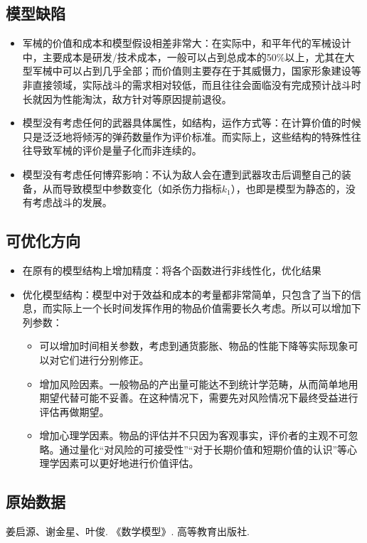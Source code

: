 \documentclass[UTF8]{mcmthesis}
\begin{document}
\subsection{模型缺陷}
\begin{itemize}
\item 军械的价值和成本和模型假设相差非常大：在实际中，和平年代的军械设计中，主要成本是研发/技术成本，一般可以占到总成本的50\%以上，尤其在大型军械中可以占到几乎全部；而价值则主要存在于其威慑力，国家形象建设等非直接领域，实际战斗的需求相对较低，而且往往会面临没有完成预计战斗时长就因为性能淘汰，敌方针对等原因提前退役。
\item 模型没有考虑任何的武器具体属性，如结构，运作方式等：在计算价值的时候只是泛泛地将倾泻的弹药数量作为评价标准。而实际上，这些结构的特殊性往往导致军械的评价是量子化而非连续的。
\item 模型没有考虑任何博弈影响：不认为敌人会在遭到武器攻击后调整自己的装备，从而导致模型中参数变化（如杀伤力指标$k_1$），也即是模型为静态的，没有考虑战斗的发展。
\end{itemize}

\subsection{可优化方向}
\begin{itemize}
\item 在原有的模型结构上增加精度：将各个函数进行非线性化，优化结果
\item 优化模型结构：模型中对于效益和成本的考量都非常简单，只包含了当下的信息，而实际上一个长时间发挥作用的物品价值需要长久考虑。所以可以增加下列参数：
\begin{itemize}
\item 可以增加时间相关参数，考虑到通货膨胀、物品的性能下降等实际现象可以对它们进行分别修正。
\item 增加风险因素。一般物品的产出量可能达不到统计学范畴，从而简单地用期望代替可能不妥善。在这种情况下，需要先对风险情况下最终受益进行评估再做期望。
\item 增加心理学因素。物品的评估并不只因为客观事实，评价者的主观不可忽略。通过量化“对风险的可接受性”“对于长期价值和短期价值的认识”等心理学因素可以更好地进行价值评估。
\end{itemize}
\end{itemize}

\begin{appendices}
\section{原始数据}

\end{appendices}
\begin{thebibliography}{123456} 
 姜启源、谢金星、叶俊. 《数学模型》. 高等教育出版社. 
\end{thebibliography}
\end{document}
